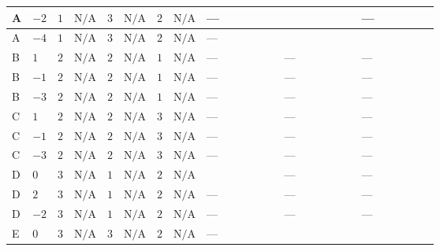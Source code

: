 \documentclass[8pt]{article}
\begin{document}
\begin{landscape}
\begin{longtable}{@{}llcccccc >{\raggedright\arraybackslash}p{0.21\linewidth} >{\raggedright\arraybackslash}p{0.21\linewidth} >{\raggedright\arraybackslash}p{0.21\linewidth}@{}}
\midrule
A & $-2$ & $1$ & $\text{N/A}$ & $3$ & $\text{N/A}$ & $2$ & $\text{N/A}$ & --- & \scriptsize\adjustbox{max width=\linewidth}{$\begin{gathered} +22 {g_2}^4\end{gathered}$} & --- \\
\midrule
A & $-4$ & $1$ & $\text{N/A}$ & $3$ & $\text{N/A}$ & $2$ & $\text{N/A}$ & --- & \scriptsize\adjustbox{max width=\linewidth}{$\begin{gathered} 22 {g_2}^4\end{gathered}$} & \scriptsize\adjustbox{max width=\linewidth}{$\begin{gathered} +{g_1}^2 \left(8 {g_2}^2-12 {\lambda_{S_2}^{(1)}}\right)\end{gathered}$} \\
\midrule
B & $1$ & $2$ & $\text{N/A}$ & $2$ & $\text{N/A}$ & $1$ & $\text{N/A}$ & --- & --- & --- \\
\midrule
B & $-1$ & $2$ & $\text{N/A}$ & $2$ & $\text{N/A}$ & $1$ & $\text{N/A}$ & --- & --- & --- \\
\midrule
B & $-3$ & $2$ & $\text{N/A}$ & $2$ & $\text{N/A}$ & $1$ & $\text{N/A}$ & --- & --- & --- \\
\midrule
C & $1$ & $2$ & $\text{N/A}$ & $2$ & $\text{N/A}$ & $3$ & $\text{N/A}$ & --- & --- & --- \\
\midrule
C & $-1$ & $2$ & $\text{N/A}$ & $2$ & $\text{N/A}$ & $3$ & $\text{N/A}$ & --- & --- & --- \\
\midrule
C & $-3$ & $2$ & $\text{N/A}$ & $2$ & $\text{N/A}$ & $3$ & $\text{N/A}$ & --- & --- & --- \\
\midrule
D & $0$ & $3$ & $\text{N/A}$ & $1$ & $\text{N/A}$ & $2$ & $\text{N/A}$ & \scriptsize\adjustbox{max width=\linewidth}{$\begin{gathered} 24 {\lambda_{X_{5}}^{(1)}} \left({\lambda_{X_{5}}^{(1)}}\right)^{*}\end{gathered}$} & --- & --- \\
\midrule
D & $2$ & $3$ & $\text{N/A}$ & $1$ & $\text{N/A}$ & $2$ & $\text{N/A}$ & --- & --- & --- \\
\midrule
D & $-2$ & $3$ & $\text{N/A}$ & $1$ & $\text{N/A}$ & $2$ & $\text{N/A}$ & --- & --- & --- \\
\midrule
E & $0$ & $3$ & $\text{N/A}$ & $3$ & $\text{N/A}$ & $2$ & $\text{N/A}$ & --- & \scriptsize\adjustbox{max width=\linewidth}{$\begin{gathered} +22 {g_2}^4\end{gathered}$} & \scriptsize\adjustbox{max width=\linewidth}{$\begin{gathered} +{g_1}^2 \left(8 {g_2}^2-12 {\lambda_{S_2}^{(1)}}\right)\end{gathered}$} \\

\end{longtable}
\end{landscape}
\end{document}
